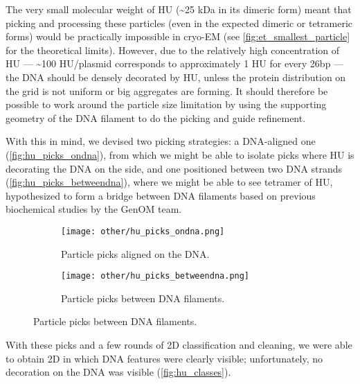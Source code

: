 The very small molecular weight of HU (\sim25 kDa in its dimeric form) meant that picking and processing these particles (even in the expected dimeric or tetrameric forms) would be practically impossible in cryo-EM (see \autoref{fig:et_smallest_particle} for the theoretical limits).
However, due to the relatively high concentration of HU --- \sim100 HU/plasmid corresponds to approximately 1 HU for every 26bp --- the DNA should be densely decorated by HU, unless the protein distribution on the grid is not uniform or big aggregates are forming.
It should therefore be possible to work around the particle size limitation by using the supporting geometry of the DNA filament to do the picking and guide refinement.

With this in mind, we devised two picking strategies: a DNA-aligned one (\autoref{fig:hu_picks_ondna}), from which we might be able to isolate picks where HU is decorating the DNA on the side, and one positioned between two DNA strands (\autoref{fig:hu_picks_betweendna}), where we might be able to see tetramer of HU, hypothesized to form a bridge between DNA filaments based on previous biochemical studies by the GenOM team.

\begin{figure}[ht]
    \centering
    \begin{subfigure}[B]{.49\textwidth}
        \centering
        \texttt{[image: other/hu\_picks\_ondna.png]}
        \caption{Particle picks aligned on the DNA.}
        \label{fig:hu_picks_ondna}
    \end{subfigure}%
    \hfill
    \begin{subfigure}[B]{.49\textwidth}
        \centering
        \texttt{[image: other/hu\_picks\_betweendna.png]}
        \caption{Particle picks between DNA filaments.}
        \label{fig:hu_picks_betweendna}
    \end{subfigure}%
    \label{gih:hu_picks}
\end{figure}

With these picks and a few rounds of 2D classification and cleaning, we were able to obtain 2D in which DNA features were clearly visible; unfortunately, no decoration on the DNA was visible (\autoref{fig:hu_classes}).

